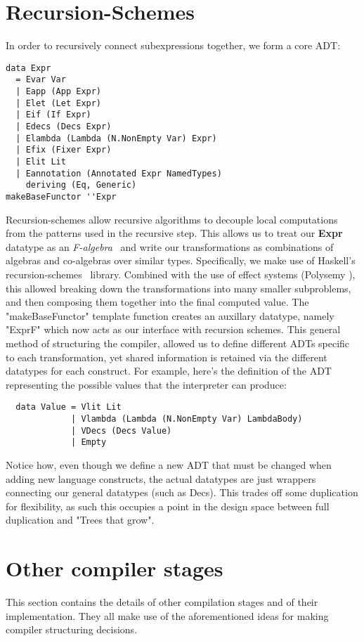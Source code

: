 \section{Recursion-Schemes}\label{recursion-schemes}
    In order to recursively connect subexpressions together, we form a core ADT:
\begin{verbatim}
data Expr
  = Evar Var
  | Eapp (App Expr)
  | Elet (Let Expr)
  | Eif (If Expr)
  | Edecs (Decs Expr)
  | Elambda (Lambda (N.NonEmpty Var) Expr)
  | Efix (Fixer Expr)
  | Elit Lit
  | Eannotation (Annotated Expr NamedTypes)
    deriving (Eq, Generic)
makeBaseFunctor ''Expr
\end{verbatim}
    Recursion-schemes \cite{Meijer1991} allow recursive algorithms to decouple local computations from the patterns used in the recursive step.
    This allows us to treat our \textbf{Expr} datatype as an \textit{F-algebra}~\cite{falgebra} and write our transformations as combinations of algebras and co-algebras over similar types.
    Specifically, we make use of Haskell's recursion-schemes~\cite{kmett} library.
    Combined with the use of effect systems (Polysemy \cite{polysemy}), this allowed breaking down the transformations into many smaller subproblems, and then composing them together into the final computed value.
    The "makeBaseFunctor" template function creates an auxillary datatype, namely "ExprF" which now acts as our interface with recursion schemes.
    This general method of structuring the compiler, allowed us to define different ADTs specific to each transformation, yet shared information is retained via the different datatypes for each construct.
    For example, here's the definition of the ADT representing the possible values that the interpreter can produce:
\begin{verbatim}
  data Value = Vlit Lit
             | Vlambda (Lambda (N.NonEmpty Var) LambdaBody)
             | VDecs (Decs Value)
             | Empty
\end{verbatim}
    Notice how, even though we define a new ADT that must be changed when adding new language constructs, the actual datatypes are just wrappers connecting our general datatypes (such as Decs).
    This trades off some duplication for flexibility, as such this occupies a point in the design space between full duplication and "Trees that grow".


\section{Other compiler stages}\label{compiler-stages}
    This section contains the details of other compilation stages and of their implementation. They all make use of the aforementioned ideas for making compiler structuring decisions.
